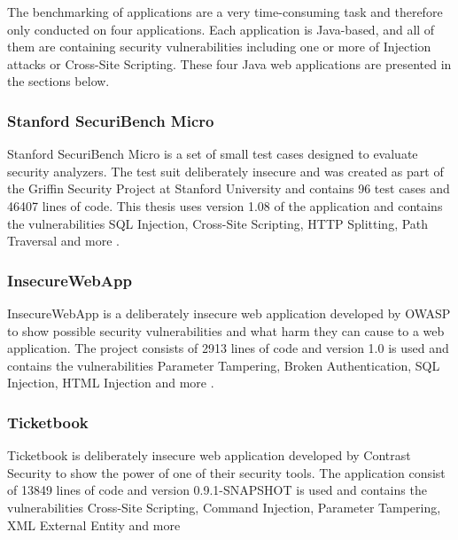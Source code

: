The benchmarking of applications are a very time-consuming task and therefore only conducted on four applications. Each application is Java-based, and all of them are containing security vulnerabilities including one or more of Injection attacks or Cross-Site Scripting. These four Java web applications are presented in the sections below.



\subsubsection{Stanford SecuriBench Micro}
Stanford SecuriBench Micro is a set of small test cases designed to evaluate security analyzers. The test suit deliberately insecure and was created as part of the Griffin Security Project \parencite{griffin} at Stanford University and contains 96 test cases and 46407 lines of code. This thesis uses version 1.08 of the application and contains the vulnerabilities SQL Injection, Cross-Site Scripting, HTTP Splitting, Path Traversal and more \parencite{securiBenchMicro, microfaq}. 



\subsubsection{InsecureWebApp}
InsecureWebApp is a deliberately insecure web application developed by OWASP to show possible security vulnerabilities and what harm they can cause to a web application. The project consists of 2913 lines of code and version 1.0 is used and contains the vulnerabilities Parameter Tampering, Broken Authentication, SQL Injection, HTML Injection and more \parencite{insecure}. 



\subsubsection{Ticketbook}
Ticketbook is deliberately insecure web application developed by Contrast Security to show the power of one of their security tools. The application consist of 13849 lines of code and version 0.9.1-SNAPSHOT is used and contains the vulnerabilities Cross-Site Scripting, Command Injection, Parameter Tampering, XML External Entity and more \parencite{ticketbook, contrast}



